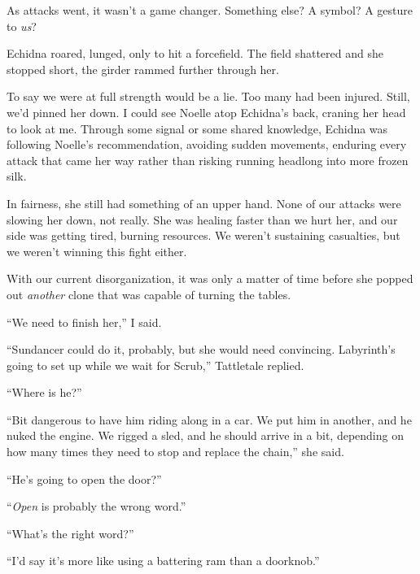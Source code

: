 As attacks went, it wasn't a game changer.  Something else?  A symbol?  A gesture to \emph{us}?



Echidna roared, lunged, only to hit a forcefield.  The field shattered and she stopped short, the girder rammed further through her.



To say we were at full strength would be a lie.  Too many had been injured.  Still, we'd pinned her down.  I could see Noelle atop Echidna's back, craning her head to look at me.  Through some signal or some shared knowledge, Echidna was following Noelle's recommendation, avoiding sudden movements, enduring every attack that came her way rather than risking running headlong into more frozen silk.



In fairness, she still had something of an upper hand.  None of our attacks were slowing her down, not really.  She was healing faster than we hurt her, and our side was getting tired, burning resources.  We weren't sustaining casualties, but we weren't winning this fight either.



With our current disorganization, it was only a matter of time before she popped out \emph{another }clone that was capable of turning the tables.



``We need to finish her,'' I said.



``Sundancer could do it, probably, but she would need convincing.  Labyrinth's going to set up while we wait for Scrub,'' Tattletale replied.



``Where is he?''



``Bit dangerous to have him riding along in a car.  We put him in another, and he nuked the engine.  We rigged a sled, and he should arrive in a bit, depending on how many times they need to stop and replace the chain,'' she said.



``He's going to open the door?''



``\emph{Open} is probably the wrong word.''



``What's the right word?''



``I'd say it's more like using a battering ram than a doorknob.''



